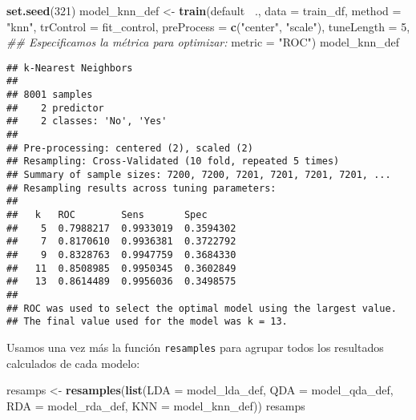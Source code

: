 \documentclass[]{book}
\newenvironment{Shaded}{\begin{snugshade}}{\end{snugshade}}
\newcommand{\CommentTok}[1]{\textcolor[rgb]{0.56,0.35,0.01}{\textit{#1}}}
\newcommand{\DataTypeTok}[1]{\textcolor[rgb]{0.13,0.29,0.53}{#1}}
\newcommand{\DecValTok}[1]{\textcolor[rgb]{0.00,0.00,0.81}{#1}}
\newcommand{\KeywordTok}[1]{\textcolor[rgb]{0.13,0.29,0.53}{\textbf{#1}}}
\newcommand{\NormalTok}[1]{#1}
\newcommand{\OperatorTok}[1]{\textcolor[rgb]{0.81,0.36,0.00}{\textbf{#1}}}
\newcommand{\StringTok}[1]{\textcolor[rgb]{0.31,0.60,0.02}{#1}}
\begin{document}
\begin{Shaded}
\begin{Highlighting}[]
\KeywordTok{set.seed}\NormalTok{(}\DecValTok{321}\NormalTok{)}
\NormalTok{model_knn_def <-}\StringTok{ }\KeywordTok{train}\NormalTok{(default }\OperatorTok{~}\NormalTok{.,}
                       \DataTypeTok{data =}\NormalTok{ train_df,}
                       \DataTypeTok{method =} \StringTok{"knn"}\NormalTok{,}
                       \DataTypeTok{trControl =}\NormalTok{ fit_control,}
                       \DataTypeTok{preProcess =} \KeywordTok{c}\NormalTok{(}\StringTok{"center"}\NormalTok{, }\StringTok{"scale"}\NormalTok{),}
                       \DataTypeTok{tuneLength =} \DecValTok{5}\NormalTok{,}
                       \CommentTok{## Especificamos la métrica para optimizar:}
                       \DataTypeTok{metric =} \StringTok{"ROC"}\NormalTok{)}
\NormalTok{model_knn_def}
\end{Highlighting}
\end{Shaded}

\begin{verbatim}
## k-Nearest Neighbors 
## 
## 8001 samples
##    2 predictor
##    2 classes: 'No', 'Yes' 
## 
## Pre-processing: centered (2), scaled (2) 
## Resampling: Cross-Validated (10 fold, repeated 5 times) 
## Summary of sample sizes: 7200, 7200, 7201, 7201, 7201, 7201, ... 
## Resampling results across tuning parameters:
## 
##   k   ROC        Sens       Spec     
##    5  0.7988217  0.9933019  0.3594302
##    7  0.8170610  0.9936381  0.3722792
##    9  0.8328763  0.9947759  0.3684330
##   11  0.8508985  0.9950345  0.3602849
##   13  0.8614489  0.9956036  0.3498575
## 
## ROC was used to select the optimal model using the largest value.
## The final value used for the model was k = 13.
\end{verbatim}

Usamos una vez más la función \texttt{resamples} para agrupar todos los resultados calculados de cada modelo:

\begin{Shaded}
\begin{Highlighting}[]
\NormalTok{resamps <-}\StringTok{ }\KeywordTok{resamples}\NormalTok{(}\KeywordTok{list}\NormalTok{(}\DataTypeTok{LDA =}\NormalTok{ model_lda_def,}
                          \DataTypeTok{QDA =}\NormalTok{ model_qda_def,}
                          \DataTypeTok{RDA =}\NormalTok{ model_rda_def,}
                          \DataTypeTok{KNN =}\NormalTok{ model_knn_def))}
\NormalTok{resamps}
\end{Highlighting}
\end{Shaded}
\end{document}

